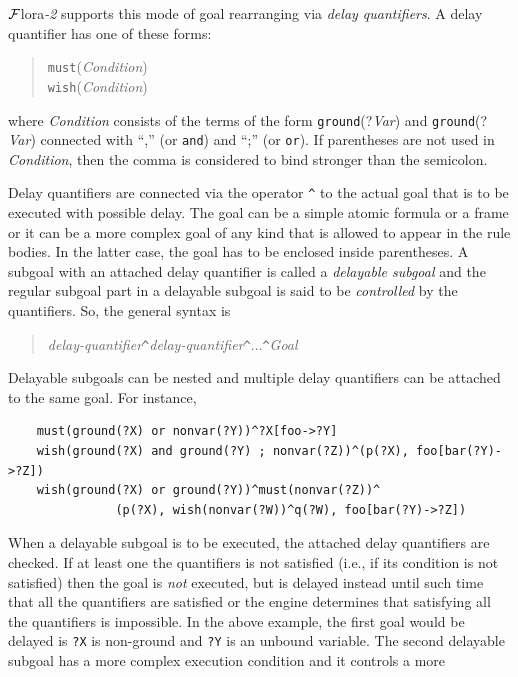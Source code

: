 \documentclass[11pt]{article}
\newcommand{\FLSYSTEM}{{\mbox{\sc ${\cal F}${lora}\rm\emph{-2}}}\xspace}
\begin{document}
\FLSYSTEM supports this mode of goal rearranging via \emph{delay quantifiers}.  
A delay quantifier has one of these forms:
\begin{quote}
  \texttt{must}(\emph{Condition})\\
  \texttt{wish}(\emph{Condition})  
\end{quote}
where \emph{Condition} consists of the terms of the form
\texttt{ground}(?\emph{Var}) and \texttt{ground}(?\emph{Var})
connected with ``,'' (or \texttt{and}) and ``;'' (or \texttt{or}).  
If parentheses are not used in \emph{Condition}, then the comma is
considered to bind stronger than the semicolon. 

Delay quantifiers are connected via the operator \texttt{\^} to the actual
goal that is to be executed with possible delay. The goal can be a simple
atomic formula or a frame or it can be a more complex goal of any kind that
is allowed to appear in the rule bodies. In the latter case, the goal has
to be enclosed inside parentheses. A subgoal with an attached delay
quantifier is called a \emph{delayable subgoal}
and the regular subgoal part in a delayable subgoal is said to be
\emph{controlled} by the quantifiers.  So, the general syntax is
\begin{quote}
   \emph{delay-quantifier}\texttt{\^}\emph{delay-quantifier}\texttt{\^}...\texttt{\^}\emph{Goal}  
\end{quote}
Delayable subgoals can be
nested and multiple delay quantifiers can be attached to the same goal.
For instance, 
\begin{verbatim}
    must(ground(?X) or nonvar(?Y))^?X[foo->?Y]
    wish(ground(?X) and ground(?Y) ; nonvar(?Z))^(p(?X), foo[bar(?Y)->?Z])
    wish(ground(?X) or ground(?Y))^must(nonvar(?Z))^
               (p(?X), wish(nonvar(?W))^q(?W), foo[bar(?Y)->?Z])
\end{verbatim}
When a delayable subgoal is to be executed, the attached delay quantifiers
are checked. If at least one the quantifiers is not satisfied (i.e., if its
condition is not satisfied) then the goal is \emph{not} executed, but is
delayed instead until such time that all the quantifiers are satisfied or
the engine determines that satisfying all the quantifiers is impossible.
In the above example, the first goal would be delayed is \texttt{?X} is
non-ground and \texttt{?Y} is an unbound variable. The second delayable
subgoal has a more complex execution condition and it controls a more
\end{document}
